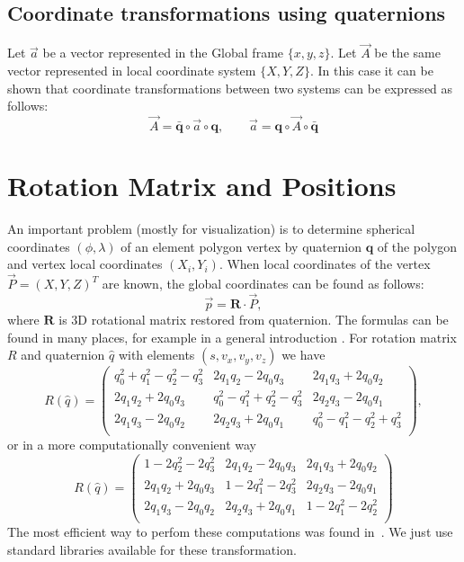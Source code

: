 \subsection{Coordinate transformations using quaternions}

Let $\vec{a}$ be a vector represented in the Global frame
$\{x,y,z\}$. Let $\vec{A}$ be the same vector represented in local
coordinate system $\{X,Y,Z\}$. In this case it can be shown that
coordinate transformations between two systems can be expressed as
follows:
\begin{equation}\label{eq:transform}
  \vec{A} = \bar{\bm{q}}\circ \vec{a} \circ \bm{q},\qquad
  \vec{a} = \bm{q}\circ \vec{A} \circ \bar{\bm{q}}
\end{equation}

\section{Rotation Matrix and Positions}\label{sec:rotquat}

An important problem (mostly for visualization) is to determine
spherical coordinates $(\phi,\lambda)$ of an element polygon vertex by
quaternion $\bm{q}$ of the polygon and vertex local coordinates
$(X_i,Y_i)$. When local coordinates of the vertex $\vec{P}=(X,Y,Z)^T$
are known, the global coordinates can be found as follows:
\begin{equation}
  \vec{p} = \bm{R}\cdot\vec{P},
\end{equation}
where $\bm{R}$ is 3D rotational matrix restored from quaternion.
The formulas can be found in many places, for example in a general
introduction \cite{bib:wikipedia-quaternions-srotation}. For rotation
matrix $R$ and quaternion $\hat q$ with elements $(s,v_x,v_y,v_z)$ we
have
\begin{equation}
  R({\hat q}) = 
    \begin{pmatrix}
      q_0^2 + q_1^2 - q_2^2 - q_3^2 & 2q_1 q_2 - 2 q_0 q_3 & 2q_1 q_3 + 2 q_0 q_2\\
      2q_1 q_2 + 2 q_0 q_3 &  q_0^2 - q_1^2 + q_2^2 - q_3^2 & 2q_2q_3-2q_0q_1 \\
      2q_1 q_3 - 2 q_0 q_2 &  2q_2q_3+2q_0q_1 & q_0^2 - q_1^2 - q_2^2 + q_3^2 \\
    \end{pmatrix},
\end{equation}
or in a more computationally convenient way
\begin{equation}
  R({\hat q}) = 
    \begin{pmatrix}
      1 - 2q_2^2 - 2q_3^2 & 2q_1 q_2 - 2 q_0 q_3 & 2q_1 q_3 + 2 q_0 q_2\\
      2q_1 q_2 + 2 q_0 q_3 &  1 - 2q_1^2 - 2q_3^2 & 2q_2q_3-2q_0q_1 \\
      2q_1 q_3 - 2 q_0 q_2 &  2q_2q_3+2q_0q_1 & 1  - 2q_1^2 - 2q_2^2 \\
    \end{pmatrix}
\end{equation}
The most efficient way to perfom these computations was found
in~\cite{bib:geometrictools-rotation-performance}. We just use
standard libraries available for these transformation.
